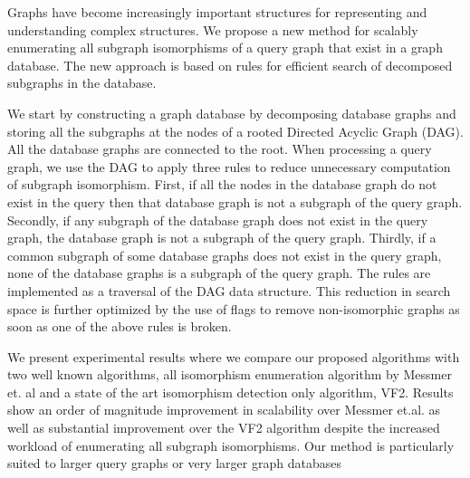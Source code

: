 
Graphs have become increasingly important structures for representing and understanding complex structures.
We propose a new method for scalably enumerating all subgraph isomorphisms of a query graph that exist in a graph database. The new approach is based on rules for efficient search of decomposed subgraphs in the database.

We start by constructing a graph database by decomposing database graphs and storing all the subgraphs at the nodes of a rooted Directed Acyclic Graph (DAG). All the database graphs are connected to the root. When processing a query graph, we use the DAG to apply three rules to reduce unnecessary computation of subgraph isomorphism. First, if all the nodes in the database graph do not exist in the query then that database graph is not a subgraph of the query graph. Secondly, if any subgraph of the database graph does not exist in the query graph, the database graph is not a subgraph of the query graph. Thirdly, if a common subgraph of some database graphs does not exist in the query graph, none of the database graphs is a subgraph of the query graph. The rules are implemented as a traversal of the DAG data structure. This reduction in search space is further optimized by the use of flags to remove non-isomorphic graphs as soon as one of the above rules is broken. 

We present experimental results where we compare our proposed algorithms with two well known algorithms, all isomorphism enumeration algorithm by Messmer et. al and a state of the art isomorphism detection only algorithm, VF2. Results show an order of magnitude improvement in scalability over Messmer et.al. as well as substantial improvement over the VF2 algorithm despite the increased workload of enumerating all subgraph isomorphisms. Our method is particularly suited to larger query graphs or very larger graph databases


